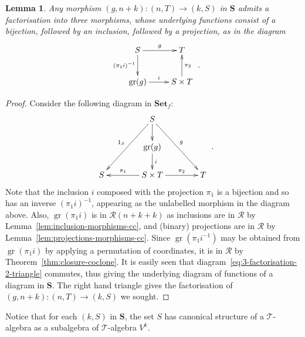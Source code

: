 \documentclass[11pt, a4paper, twoside,leqno]{amsart}
\newcommand{\cat}[1]{\mathbf{#1}}
\newcommand{\cd}[2][]{\vcenter{\hbox{\xymatrix#1{#2}}}}
\numberwithin{equation}{section}
\theoremstyle{plain}
\newtheorem{Lemma}[Thm]{Lemma}
\theoremstyle{definition}
\DeclareMathOperator{\gr}{gr}
\begin{document}
\begin{Lemma}
  \label{lem:factorisation}
  Any morphism \((g,n+k) \colon (n,T) \rightarrow
  (k,S)\) in \(\cat{S}\) admits a factorisation into three morphisms,
  whose underlying functions consist of a bijection,
  followed by an inclusion, followed by a projection, as in the diagram
  \begin{equation}
    \label{eq:3-factorisation}
    \cd{
      {S} \ar[d]_-{(\pi_{1}i)^{-1}} \ar[r]^-{g} & {T} \\
      {\gr(g)} \ar[r]^-{i} &  {S \times T} \ar[u]_-{\pi_{2}}
    }\rlap{ .}
  \end{equation}
\end{Lemma}

\begin{proof}
  Consider the following diagram in \(\cat{Set}_{f}\):
  \begin{equation}
    \label{eq:3-factorisation-2-triangle}
    \xymatrixcolsep{1.4pc}
    \xymatrixrowsep{1.6pc}
    \cd{
      && {S} \ar[ddll]_-{1_{S}} \ar[d]^-{} \ar[ddrr]^-{g} && \\
      && {\gr(g)} \ar[d]^-{i} && \\
      {S} && \ar[ll]_-{\pi_{1}} {S \times T} \ar[rr]^-{\pi_{2}} && {T}
    }\rlap{ .}
  \end{equation}
  Note that the inclusion \(i\) composed with the projection
  \(\pi_{1}\) is a bijection and so has an inverse \((\pi_{1}
  i)^{-1}\), appearing as the unlabelled morphism in the diagram above.
  Also, \(\gr(\pi_{1} i)\) is in \(\mathscr{R}(n+k+k)\) as
  inclusions are in \(\mathscr{R}\) by Lemma~\ref{lem:inclusion-morphisms-cc}, and
  (binary) projections are in \(\mathscr{R}\) by Lemma~\ref{lem:projections-morphisms-cc}.
  Since \(\gr(\pi_{1} i^{-1})\) may be obtained from \(\gr(\pi_{1} i)\) by applying a
  permutation of coordinates, it is in \(\mathscr{R}\) by
  Theorem~\ref{thm:closure-coclone}. It is easily seen that
  diagram~\eqref{eq:3-factorisation-2-triangle} commutes, thus giving the
  underlying diagram of functions of a diagram in
  \(\cat{S}\). The right hand triangle gives the factorisation of \((g,n+k) \colon (n,T) \rightarrow
  (k,S)\) we sought.
\end{proof}

Notice that
for each $(k, S)$ in $\cat{S}$, the set
$S$ has canonical structure of a $\mathscr{T}$-algebra as a subalgebra
of \(\mathscr{T}
\)-algebra $V^k$. 
\end{document}
